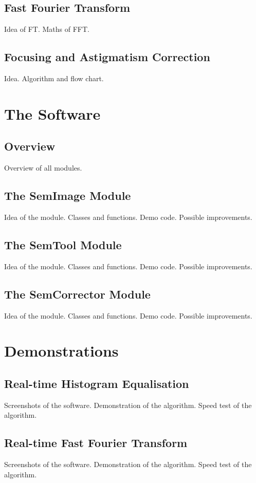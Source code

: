 \documentclass{article}
\begin{document}
\subsection{Fast Fourier Transform} 
Idea of FT.
Maths of FFT.

\subsection{Focusing and Astigmatism Correction}
Idea.
Algorithm and flow chart.

\section{The Software}
\subsection{Overview}
Overview of all modules.

\subsection{The SemImage Module}
Idea of the module.
Classes and functions.
Demo code.
Possible improvements.

\subsection{The SemTool Module}
Idea of the module.
Classes and functions.
Demo code.
Possible improvements.

\subsection{The SemCorrector Module}
Idea of the module.
Classes and functions.
Demo code.
Possible improvements.

\section{Demonstrations}
\subsection{Real-time Histogram Equalisation}
Screenshots of the software.
Demonstration of the algorithm.
Speed test of the algorithm.

\subsection{Real-time Fast Fourier Transform}
Screenshots of the software.
Demonstration of the algorithm.
Speed test of the algorithm.
\end{document}
